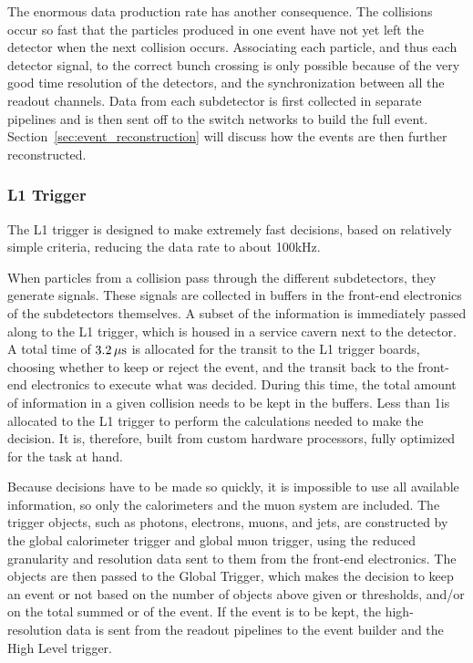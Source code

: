 The enormous data production rate has another consequence. The collisions occur so fast that the
particles produced in one event have not yet left the detector when the next collision occurs. 
Associating each particle, and thus each detector signal, to the correct bunch crossing is only
possible because of the very good time resolution of the detectors, and the synchronization between
all the readout channels. 
Data from each subdetector is first collected in separate pipelines and is then sent off to the
switch networks to build the full event. Section~\ref{sec:event_reconstruction} will discuss 
how the events are then further reconstructed.

\subsubsection{L1 Trigger \label{sec:cms_level_one}}

The L1 trigger is designed to make extremely fast decisions, based on relatively simple criteria,
reducing the data rate to about 100\unit{kHz}. 

When particles from a collision pass through the different subdetectors, they generate signals.
These signals are collected in buffers in the front-end electronics of the subdetectors themselves. 
A subset of the information is immediately passed along to the L1 trigger, which is housed
in a service cavern next to the detector. A total time of $3.2\,\mu\text{s}$ is allocated for the transit to
the L1 trigger boards, choosing whether to keep or reject the event, and the transit back to the
front-end electronics to execute what was decided. During this time, the total amount of information
in a given collision needs to be kept in the buffers.
Less than 1\mus is allocated to the L1 trigger to perform the calculations needed to make the
decision. It is, therefore, built from custom hardware processors, fully optimized for the task at
hand. 

Because decisions have to be made so quickly, it is impossible to use all available information, so
 only the calorimeters and the muon system are included. 
The trigger objects, such as photons, electrons, muons, and jets, are constructed by the global
calorimeter trigger and global muon trigger, using the reduced granularity and resolution data
sent to them from the front-end electronics. The objects are then passed to the Global Trigger,
which makes the decision to keep an event or not based on the number of objects above given \ET
or \pt thresholds, and/or on the total summed \ET or \ETm of the event. If the event is to be kept,
the high-resolution data is sent from the readout pipelines to the event builder and the High
Level trigger. 

